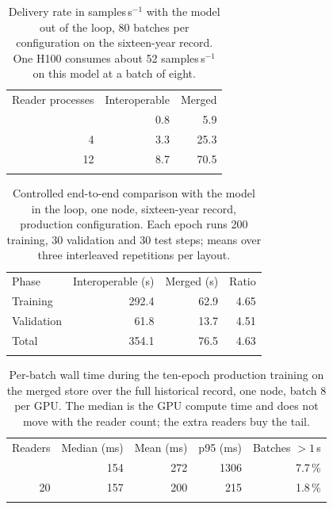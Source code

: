 \documentclass[gmd, manuscript]{copernicus}
\begin{document}
\begin{table}[t]
\caption{Delivery rate in samples\,s$^{-1}$ with the model out of the loop, 80 batches per
configuration on the sixteen-year record. One H100 consumes about 52 samples\,s$^{-1}$ on this
model at a batch of eight.}
\label{tab:delivery}
\begin{tabular}{rrr}
\tophline
Reader processes & Interoperable & Merged \\
\middlehline
 1 & 0.8 &  5.9 \\
 4 & 3.3 & 25.3 \\
12 & 8.7 & 70.5 \\
\bottomhline
\end{tabular}
\end{table}

\begin{table}[t]
\caption{Controlled end-to-end comparison with the model in the loop, one node, sixteen-year
record, production configuration. Each epoch runs 200 training, 30 validation and 30 test
steps; means over three interleaved repetitions per layout.}
\label{tab:end-to-end}
\begin{tabular}{lrrr}
\tophline
Phase & Interoperable (s) & Merged (s) & Ratio \\
\middlehline
Training   & 292.4 & 62.9 & 4.65 \\
Validation &  61.8 & 13.7 & 4.51 \\
Total      & 354.1 & 76.5 & 4.63 \\
\bottomhline
\end{tabular}
\end{table}

\begin{table}[t]
\caption{Per-batch wall time during the ten-epoch production training on the merged store over
the full historical record, one node, batch 8 per GPU. The median is the GPU compute time and
does not move with the reader count; the extra readers buy the tail.}
\label{tab:production}
\begin{tabular}{rrrrr}
\tophline
Readers & Median (ms) & Mean (ms) & p95 (ms) & Batches $>1$\,s \\
\middlehline
12 & 154 & 272 & 1306 & 7.7\,\% \\
20 & 157 & 200 &  215 & 1.8\,\% \\
\bottomhline
\end{tabular}
\end{table}
\end{document}
